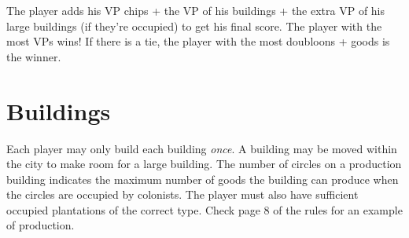 \documentclass[12pt]{article}
\begin{document}
\begin{multicols*}{2}
The player adds his VP chips + the VP of his buildings + the extra VP of his large buildings (if they're occupied) to get his final score. The player with the most VPs wins! If there is a tie, the player with the most doubloons + goods is the winner.

\section*{Buildings}
Each player may only build each building \emph{once}. A building may be moved within the city to make room for a large building. The number of circles on a production building indicates the maximum number of goods the building can produce when the circles are occupied by colonists. The player must also have sufficient occupied plantations of the correct type. Check page 8 of the rules for an example of production.

\end{multicols*}
\end{document}
